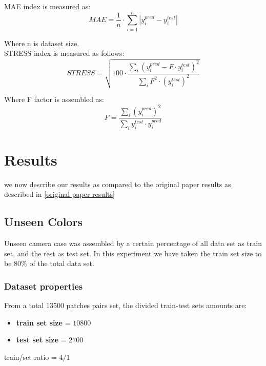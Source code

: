 MAE index is measured as:
\begin{equation}
MAE = \frac{1}{n} \cdot \sum_{i = 1}^{n}{|y^{pred}_i - y^{test}_i|}
\end{equation}

Where n is dataset size. \\

STRESS index is measured as follows:
\begin{equation}
STRESS = \sqrt{100 \cdot \dfrac{\sum\limits_{i}{(y^{pred}_i - F \cdot y^{test}_i)^2}}{\sum\limits_{i}^{}{F^2 \cdot (y^{test}_i)^2 }}}
\end{equation}

Where F factor is assembled as:
\begin{equation}
F = \dfrac{\sum\limits_{i}{(y^{pred}_i)^2}}{\sum\limits_{i}{y^{test}_i \cdot y^{pred}_i }}
\end{equation}







\section{Results}

we now describe our results as compared to the original paper results as described in \ref{original paper results}


\subsection{Unseen Colors}

Unseen camera case was assembled by a certain percentage of all data set as train set, and the rest as test set. In this experiment we have taken the train set size to be $80 \%$ of the total data set.
		
		\subsubsection{Dataset properties}
		
			From a total 13500 patches pairs set, the divided train-test sets amounts are:
			\begin{itemize}
				\item \textbf{train set size} = $10800$ 
				\item \textbf{test set size} = $2700$
			\end{itemize}
			
			train/set ratio = $4/1$
			
